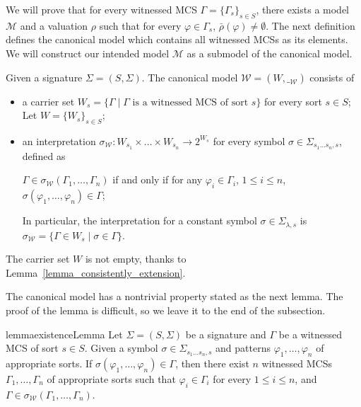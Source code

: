 \documentclass[acmsmall]{acmart}
\theoremstyle{acmdefinition}
\newcommand{\sig}{\mathbb{\Sigma}}
\newcommand{\MM}{\mathcal{M}}
\newcommand{\WW}{\mathcal{W}}
\newcommand{\sigmaW}{{\sigma_{\WW}}}
\newcommand{\barrho}{\bar{\rho}}
\newcommand{\ddd}{,\dots,}
\newcommand{\sigmaMGammaoc}{\sigma_\WW}
\newcommand{\SigmaSub}[1]{\Sigma_{#1}}
\newcommand{\pset}[1]{2^{#1}}
\begin{document}
We will prove that for every witnessed MCS 
$\Gamma = \{ \Gamma_s \}_{s \in S}$,
there exists a model $\MM$ and a valuation $\rho$ such that
for every $\varphi \in \Gamma_s$, $\barrho(\varphi) \neq \emptyset$.
The next definition defines the canonical model which
contains all witnessed MCSs as its elements.
We will construct our intended model $\MM$ as a submodel of
the canonical model.

\begin{definition}
\label{def_canonical_model}
Given a signature $\sig = (S,\Sigma)$.
The canonical model 
$\WW = (W,\__\WW)$ 
consists of
\begin{itemize}
\item a carrier set 
      $W_s = \{ \Gamma 
               \mid \text{$\Gamma$ is a witnessed MCS of sort $s$} \}$
       for every sort $s \in S$;
       Let $W = \{ W_s \}_{s \in S}$;
\item an interpretation 
      $\sigmaW \colon W_{s_1} \times \dots \times W_{s_n} \to \pset{W_s}$
      for every symbol 
      $\sigma \in \Sigma_{s_1 \dots s_n , s}$,
      defined as
      \begin{center}
        $\Gamma \in \sigmaW(\Gamma_1,\dots,\Gamma_n)$
        \quad if and only if \quad
        for any $\varphi_i \in \Gamma_i$, $1 \le i \le n$,
        $\sigma(\varphi_1,\dots,\varphi_n) \in \Gamma$;
      \end{center}
      In particular, the interpretation for a constant symbol $\sigma \in \SigmaSub{\lambda,s}$
      is $\sigma_\WW = \{ \Gamma \in W_s \mid \sigma \in \Gamma \}$.
\end{itemize}
The carrier set $W$ is not empty,
thanks to Lemma~\ref{lemma_consistently_extension}.

\end{definition}

The canonical model has a nontrivial property stated as the next lemma.
The proof of the lemma is difficult, so we leave it to the end of the subsection.

\begin{restatable}{lemma}{existenceLemma}
\label{lemma_existence_of_witmodels}
Let $\sig = (S,\Sigma)$ be a signature
and $\Gamma$ be a witnessed MCS of sort $s \in S$.
Given a symbol $\sigma \in \SigmaSub{s_1 \dots s_n , s}$
and patterns $\varphi_1 \ddd \varphi_n$ of appropriate sorts.
If $\sigma(\varphi_1 \ddd \varphi_n) \in \Gamma$,
then there exist $n$ witnessed MCSs
$\Gamma_1  \ddd
 \Gamma_n $ of appropriate sorts
such that
$\varphi_i \in \Gamma_i$ for every $1 \le i \le n$, and
$\Gamma \in \sigmaMGammaoc( \Gamma_1 \ddd \Gamma_n )$.
\end{restatable}
\end{document}
